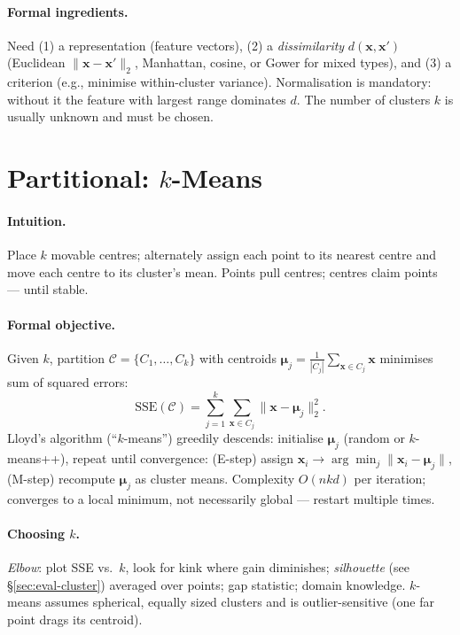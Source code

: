 \paragraph{Formal ingredients.} Need (1) a representation (feature vectors), (2) a \emph{dissimilarity} $d(\mathbf{x},\mathbf{x}')$ (Euclidean $\|\mathbf{x}-\mathbf{x}'\|_2$, Manhattan, cosine, or Gower for mixed types), and (3) a criterion (e.g., minimise within-cluster variance). Normalisation is mandatory: without it the feature with largest range dominates $d$. The number of clusters $k$ is usually unknown and must be chosen.

\section{\texorpdfstring{Partitional: $k$-Means}{Partitional: k-Means}}
\label{sec:kmeans}
\paragraph{Intuition.} Place $k$ movable centres; alternately assign each point to its nearest centre and move each centre to its cluster's mean. Points pull centres; centres claim points --- until stable.

\paragraph{Formal objective.} Given $k$, partition $\mathcal{C}=\{C_1,\dots,C_k\}$ with centroids $\boldsymbol{\mu}_j=\frac1{|C_j|}\sum_{\mathbf{x}\in C_j}\mathbf{x}$ minimises sum of squared errors:
\begin{equation}
\text{SSE}(\mathcal{C})=\sum_{j=1}^k\sum_{\mathbf{x}\in C_j}\|\mathbf{x}-\boldsymbol{\mu}_j\|_2^2.
\end{equation}
Lloyd's algorithm (``$k$-means'') greedily descends: initialise $\boldsymbol{\mu}_j$ (random or $k$-means++), repeat until convergence: (E-step) assign $\mathbf{x}_i\to\arg\min_j\|\mathbf{x}_i-\boldsymbol{\mu}_j\|$, (M-step) recompute $\boldsymbol{\mu}_j$ as cluster means. Complexity $O(nkd)$ per iteration; converges to a local minimum, not necessarily global --- restart multiple times.

\paragraph{Choosing $k$.} \emph{Elbow}: plot SSE vs.\ $k$, look for kink where gain diminishes; \emph{silhouette} (see \S\ref{sec:eval-cluster}) averaged over points; gap statistic; domain knowledge. $k$-means assumes spherical, equally sized clusters and is outlier-sensitive (one far point drags its centroid).

